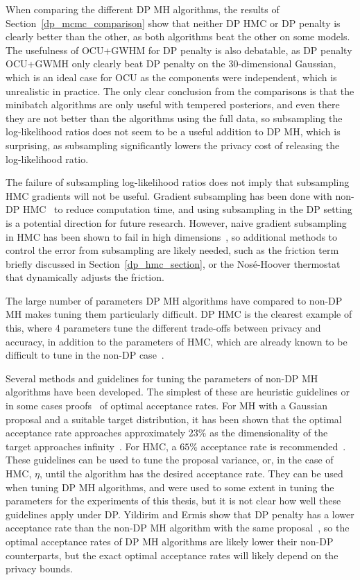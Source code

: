 \documentclass[english,twoside,openright]{HYgraduMLDS}
\begin{document}
When comparing the different DP MH algorithms, the results of
Section~\ref{dp_mcmc_comparison} show that neither DP HMC or DP penalty is
clearly better than the other, as both algorithms beat the other on some models.
The usefulness of OCU+GWHM for DP penalty is also debatable, as DP penalty
OCU+GWMH only clearly beat DP penalty on the 30-dimensional Gaussian, which
is an ideal case for OCU as the components were independent, which is unrealistic in
practice. The only
clear conclusion from the comparisons is that the minibatch algorithms are
only useful with tempered posteriors, and even there they are not better
than the algorithms using the full data, so subsampling the log-likelihood ratios
does not seem to be a useful addition to DP MH, which is surprising, as
subsampling significantly lowers the privacy cost of releasing the log-likelihood
ratio.

The failure of subsampling log-likelihood ratios does not imply that subsampling
HMC gradients will not be useful. Gradient subsampling has been done with
non-DP HMC~\cite{CFG14, DFB14} to reduce computation time, and using subsampling
in the DP setting is a potential direction for future research. However,
naive gradient subsampling in HMC has been shown to fail in high
dimensions~\cite{Bet15}, so additional methods to control the error from subsampling
are likely needed, such as the friction term~\cite{CFG14} briefly discussed in
Section~\ref{dp_hmc_section}, or the Nosé-Hoover thermostat~\cite{DFB14} that
dynamically adjusts the friction.

The large number of parameters DP MH algorithms have compared to non-DP
MH makes tuning them particularly difficult. DP HMC is the clearest example
of this, where 4 parameters tune the different trade-offs between privacy and
accuracy, in addition to the parameters of HMC, which are already known to
be difficult to tune in the non-DP case~\cite{neal2012mcmc}.

Several methods and guidelines for tuning the parameters of non-DP MH algorithms
have been developed. The simplest of these are heuristic guidelines or in some
cases proofs~\cite{RGG97} of optimal acceptance rates. For MH with a Gaussian
proposal and a suitable target distribution, it has been shown that the optimal
acceptance rate approaches approximately \(23\%\) as the dimensionality of the
target approaches infinity~\cite{RGG97}. For HMC, a \(65\%\) acceptance rate
is recommended~\cite{neal2012mcmc}. These guidelines can be used to tune the
proposal variance,
or, in the case of HMC, \(\eta\), until the algorithm has the desired acceptance
rate. They can be used when tuning DP MH algorithms, and were used to some
extent in tuning the parameters for the experiments of this thesis, but it
is not clear how well these guidelines apply under DP.
Yildirim and Ermis show that DP penalty has a lower acceptance
rate than the non-DP MH algorithm with the same proposal~\cite{YildirimE19},
so the optimal
acceptance rates of DP MH algorithms are likely lower their non-DP
counterparts, but the exact optimal acceptance rates will likely depend on the
privacy bounds.
\end{document}
